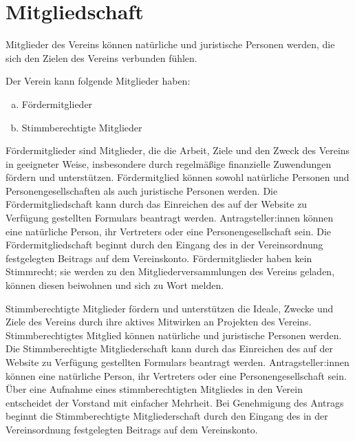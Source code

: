 \section{Mitgliedschaft}
\begin{contract}

    Mitglieder des Vereins können natürliche und juristische Personen werden, die sich den Zielen des Vereins verbunden fühlen.

    Der Verein kann folgende Mitglieder haben:
    \begin{enumerate}[(a)]
        \item Fördermitglieder
        \item Stimmberechtigte Mitglieder
    \end{enumerate}


    Fördermitglieder sind Mitglieder, die die Arbeit, Ziele und den Zweck des Vereins in geeigneter Weise, insbesondere durch regelmäßige finanzielle Zuwendungen fördern und unterstützen.
    Fördermitglied können sowohl natürliche Personen und Personengesellschaften als auch juristische Personen werden.
    Die Fördermitgliedschaft kann durch das Einreichen des auf der Website zu Verfügung gestellten Formulars beantragt werden. Antragsteller:innen können eine natürliche Person, ihr Vertreters oder eine Personengesellschaft sein. Die Fördermitgliedschaft beginnt durch den Eingang des in der Vereinsordnung festgelegten Beitrags auf dem Vereinskonto.
    Fördermitglieder haben kein Stimmrecht; sie werden zu den Mitgliederversammlungen des Vereins geladen, können diesen beiwohnen und sich zu Wort melden.

    Stimmberechtigte Mitglieder fördern und unterstützen die Ideale, Zwecke und Ziele des Vereins durch ihre aktives Mitwirken an Projekten des Vereins. Stimmberechtigtes
    Mitglied können natürliche und juristische Personen werden.
    Die Stimmberechtigte Mitgliederschaft kann durch das Einreichen des auf der Website zu Verfügung gestellten Formulars beantragt werden. Antragsteller:innen können eine natürliche Person, ihr Vertreters oder eine Personengesellschaft sein. Über eine Aufnahme eines stimmberechtigten Mitgliedes in den Verein entscheidet der Vorstand mit einfacher Mehrheit. Bei Genehmigung des Antrags  beginnt die Stimmberechtigte Mitgliederschaft durch den Eingang des in der Vereinsordnung festgelegten Beitrags auf dem Vereinskonto.



\end{contract}
